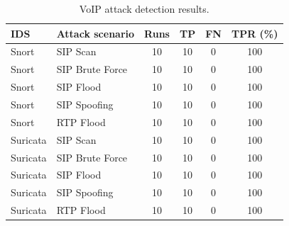 \begin{table}[t]
\centering
\caption{VoIP attack detection results.}
\label{tab:detection}
\begin{tabular}{llcccc}
\hline
IDS & Attack scenario & Runs & TP & FN & TPR (\%) \\
\hline
Snort & SIP Scan & 10 & 10 & 0 & 100 \\
Snort & SIP Brute Force & 10 & 10 & 0 & 100 \\
Snort & SIP Flood & 10 & 10 & 0 & 100 \\
Snort & SIP Spoofing & 10 & 10 & 0 & 100 \\
Snort & RTP Flood & 10 & 10 & 0 & 100 \\
\hline
Suricata & SIP Scan & 10 & 10 & 0 & 100 \\
Suricata & SIP Brute Force & 10 & 10 & 0 & 100 \\
Suricata & SIP Flood & 10 & 10 & 0 & 100 \\
Suricata & SIP Spoofing & 10 & 10 & 0 & 100 \\
Suricata & RTP Flood & 10 & 10 & 0 & 100 \\
\hline
\end{tabular}
\end{table}
